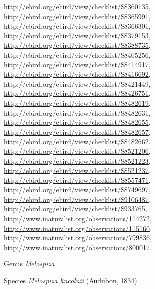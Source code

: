 \documentclass[9pt, article]{memoir}
\begin{document}
\begin{multicols}{2}
\url{http://ebird.org/ebird/view/checklist/S8360135}, 
\url{http://ebird.org/ebird/view/checklist/S8365991}, 
\url{http://ebird.org/ebird/view/checklist/S8366301}, 
\url{http://ebird.org/ebird/view/checklist/S8379153}, 
\url{http://ebird.org/ebird/view/checklist/S8388735}, 
\url{http://ebird.org/ebird/view/checklist/S8405256}, 
\url{http://ebird.org/ebird/view/checklist/S8414917}, 
\url{http://ebird.org/ebird/view/checklist/S8416692}, 
\url{http://ebird.org/ebird/view/checklist/S8421449}, 
\url{http://ebird.org/ebird/view/checklist/S8426751}, 
\url{http://ebird.org/ebird/view/checklist/S8482619}, 
\url{http://ebird.org/ebird/view/checklist/S8482631}, 
\url{http://ebird.org/ebird/view/checklist/S8482655}, 
\url{http://ebird.org/ebird/view/checklist/S8482657}, 
\url{http://ebird.org/ebird/view/checklist/S8482662}, 
\url{http://ebird.org/ebird/view/checklist/S8521206}, 
\url{http://ebird.org/ebird/view/checklist/S8521223}, 
\url{http://ebird.org/ebird/view/checklist/S8521237}, 
\url{http://ebird.org/ebird/view/checklist/S8557471}, 
\url{http://ebird.org/ebird/view/checklist/S8749697}, 
\url{http://ebird.org/ebird/view/checklist/S9106487}, 
\url{http://ebird.org/ebird/view/checklist/S933765}, 
\url{http://www.inaturalist.org/observations/114272}, 
\url{http://www.inaturalist.org/observations/115160}, 
\url{http://www.inaturalist.org/observations/799836}, 
\url{http://www.inaturalist.org/observations/800017}.

\vspace{6pt}\noindent\hspace{30pt}Genus \textit{Melospiza}


\vspace{6pt}\noindent\hspace{36pt}Species \textit{Melospiza lincolnii} (Audubon, 1834)



\end{multicols}
\end{document}
